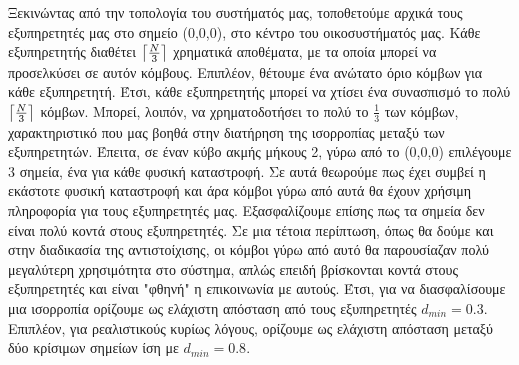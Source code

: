 \vspace{-5pt}

 Ξεκινώντας από την τοπολογία του συστήματός μας, τοποθετούμε αρχικά τους εξυπηρετητές μας στο σημείο (0,0,0), στο κέντρο του οικοσυστήματός μας. Κάθε εξυπηρετητής διαθέτει $\ceil*{\frac{N}{3}}$ χρηματικά αποθέματα, με τα οποία μπορεί να προσελκύσει σε αυτόν κόμβους. Επιπλέον, θέτουμε ένα ανώτατο όριο κόμβων για κάθε εξυπηρετητή. Έτσι, κάθε εξυπηρετητής μπορεί να χτίσει ένα συνασπισμό το πολύ $\ceil*{\frac{N}{3}}$ κόμβων. Μπορεί, λοιπόν, να χρηματοδοτήσει το πολύ το $\frac{1}{3}$ των κόμβων, χαρακτηριστικό που μας βοηθά στην διατήρηση της ισορροπίας μεταξύ των εξυπηρετητών. Έπειτα, σε έναν κύβο ακμής μήκους 2, γύρω από το (0,0,0) επιλέγουμε 3 σημεία, ένα για κάθε φυσική καταστροφή. Σε αυτά θεωρούμε πως έχει συμβεί η εκάστοτε φυσική καταστροφή και άρα κόμβοι γύρω από αυτά θα έχουν χρήσιμη πληροφορία για τους εξυπηρετητές μας. Εξασφαλίζουμε επίσης πως τα σημεία δεν είναι πολύ κοντά στους εξυπηρετητές. Σε μια τέτοια περίπτωση, όπως θα δούμε και στην διαδικασία της αντιστοίχισης, οι κόμβοι γύρω από αυτό θα παρουσίαζαν πολύ μεγαλύτερη χρησιμότητα στο σύστημα, απλώς επειδή βρίσκονται κοντά στους εξυπηρετητές και είναι "φθηνή" η επικοινωνία με αυτούς. Έτσι, για να διασφαλίσουμε μια ισορροπία ορίζουμε ως ελάχιστη απόσταση από τους εξυπηρετητές $d_{min} = 0.3$. Επιπλέον, για ρεαλιστικούς κυρίως λόγους, ορίζουμε ως ελάχιστη απόσταση μεταξύ δύο κρίσιμων σημείων ίση με $d_{min} = 0.8$. 

